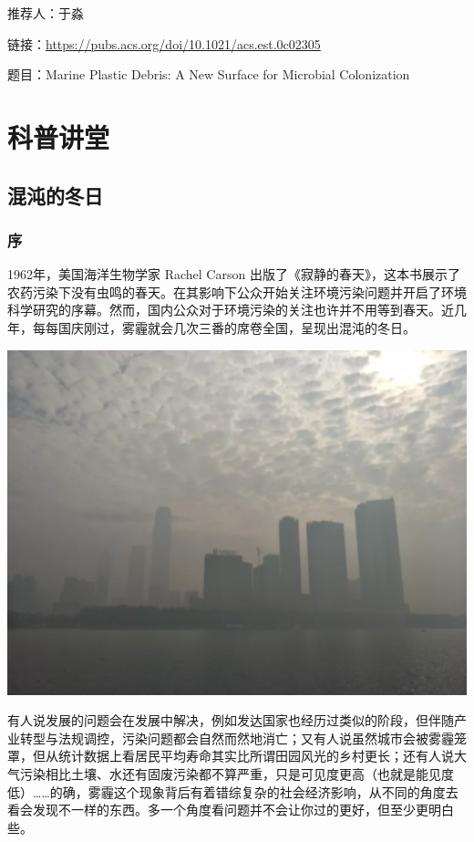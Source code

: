 \documentclass[]{book}
\begin{document}
推荐人：于淼

链接：\url{https://pubs.acs.org/doi/10.1021/acs.est.0c02305}

题目：Marine Plastic Debris: A New Surface for Microbial Colonization

\hypertarget{popsci}{%
\chapter{科普讲堂}\label{popsci}}

\hypertarget{ux6df7ux6c8cux7684ux51acux65e5}{%
\section{混沌的冬日}\label{ux6df7ux6c8cux7684ux51acux65e5}}

\hypertarget{ux5e8f}{%
\subsection{序}\label{ux5e8f}}

1962年，美国海洋生物学家 Rachel Carson 出版了《寂静的春天》，这本书展示了农药污染下没有虫鸣的春天。在其影响下公众开始关注环境污染问题并开启了环境科学研究的序幕。然而，国内公众对于环境污染的关注也许并不用等到春天。近几年，每每国庆刚过，雾霾就会几次三番的席卷全国，呈现出混沌的冬日。

\includegraphics[width=6.67in]{images/cw1}

有人说发展的问题会在发展中解决，例如发达国家也经历过类似的阶段，但伴随产业转型与法规调控，污染问题都会自然而然地消亡；又有人说虽然城市会被雾霾笼罩，但从统计数据上看居民平均寿命其实比所谓田园风光的乡村更长；还有人说大气污染相比土壤、水还有固废污染都不算严重，只是可见度更高（也就是能见度低）\ldots{}\ldots{}的确，雾霾这个现象背后有着错综复杂的社会经济影响，从不同的角度去看会发现不一样的东西。多一个角度看问题并不会让你过的更好，但至少更明白些。
\end{document}
